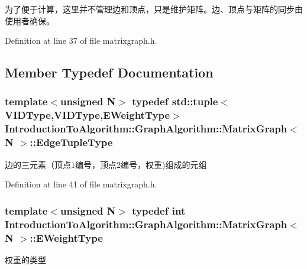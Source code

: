 为了便于计算，这里并不管理边和顶点，只是维护矩阵。边、顶点与矩阵的同步由使用者确保。 

Definition at line 37 of file matrixgraph.\+h.



\subsection{Member Typedef Documentation}
\hypertarget{struct_introduction_to_algorithm_1_1_graph_algorithm_1_1_matrix_graph_ad698e07bacdb3f332c4f5d34bdb49463}{}
\subsubsection[{Edge\+Tuple\+Type}]{\setlength{\rightskip}{0pt plus 5cm}template$<$unsigned N$>$ typedef std\+::tuple$<${\bf V\+I\+D\+Type},{\bf V\+I\+D\+Type},{\bf E\+Weight\+Type}$>$ {\bf Introduction\+To\+Algorithm\+::\+Graph\+Algorithm\+::\+Matrix\+Graph}$<$ N $>$\+::{\bf Edge\+Tuple\+Type}}\label{struct_introduction_to_algorithm_1_1_graph_algorithm_1_1_matrix_graph_ad698e07bacdb3f332c4f5d34bdb49463}
边的三元素（顶点1编号，顶点2编号，权重)组成的元组 

Definition at line 41 of file matrixgraph.\+h.

\hypertarget{struct_introduction_to_algorithm_1_1_graph_algorithm_1_1_matrix_graph_af54dbf6d171b89b81b490de13f1fb02f}{}
\subsubsection[{E\+Weight\+Type}]{\setlength{\rightskip}{0pt plus 5cm}template$<$unsigned N$>$ typedef int {\bf Introduction\+To\+Algorithm\+::\+Graph\+Algorithm\+::\+Matrix\+Graph}$<$ N $>$\+::{\bf E\+Weight\+Type}}\label{struct_introduction_to_algorithm_1_1_graph_algorithm_1_1_matrix_graph_af54dbf6d171b89b81b490de13f1fb02f}
权重的类型 

